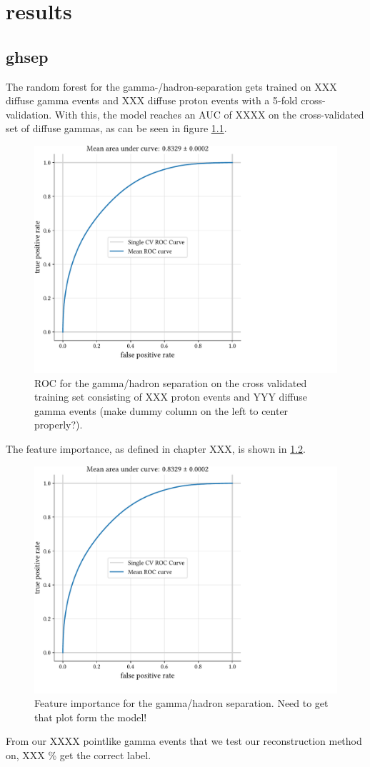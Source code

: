 \chapter{results}\label{results}


\section{ghsep}\label{ghsep}

The random forest for the gamma-/hadron-separation gets trained on 
XXX diffuse gamma events and XXX diffuse proton events with a 5-fold cross-validation.
With this, the model reaches an AUC 
of XXXX on the cross-validated set of diffuse gammas, as can be seen in figure \ref{fig:gh_roc}.

\begin{figure}
    \centering
    \includegraphics[page=1, width=.8\textwidth]{../analysis/plots/cross_val_sep_perf_plot.pdf}
    \caption{ROC for the gamma/hadron separation on the cross validated training set 
    consisting of XXX proton events and YYY diffuse gamma events (make dummy column on the left to center properly?).}
    \label{fig:gh_roc}
\end{figure}

The feature importance, as defined in chapter XXX, is shown in \ref{fig:gh_features}.
\begin{figure}
    \centering
    \includegraphics[page=1, width=.8\textwidth]{../analysis/plots/cross_val_sep_perf_plot.pdf}
    \caption{Feature importance for the gamma/hadron separation. Need to get that plot form the model!}
    \label{fig:gh_features}
\end{figure}


From our XXXX pointlike gamma events that we test our reconstruction method on, 
XXX \% get the correct label.
